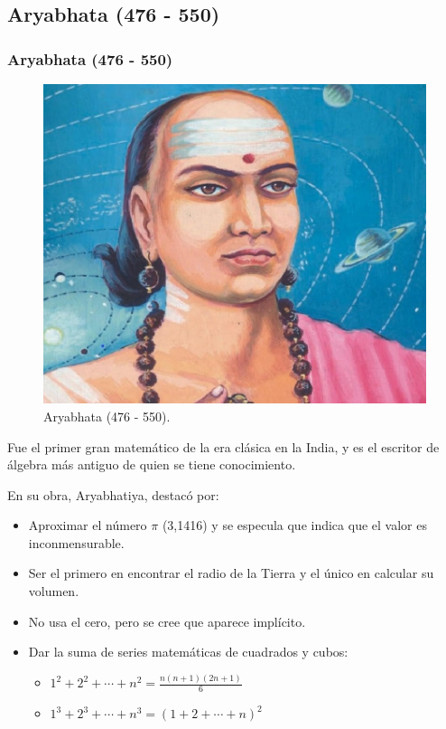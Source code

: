 \documentclass[compress, aspectratio=169]{beamer} %
\begin{document}
	\subsection{Aryabhata (476 - 550)}
		\begin{frame}
			\frametitle{Aryabhata (476 - 550)}
			\begin{figure}
				\centering
				\includegraphics[width = .4\linewidth]{aryabhata.jpg}
				\caption{Aryabhata (476 - 550).}
			\end{figure}
		\end{frame}
		
		\begin{frame}
			Fue el primer gran matemático de la era clásica en la India, y es el escritor de álgebra más antiguo
			de quien se tiene conocimiento.
			
			En su obra, Aryabhatiya, destacó por:
			\begin{itemize}
				\item Aproximar el número $\pi$ (3,1416) y se especula que indica que el valor es inconmensurable.
				\item Ser el primero en encontrar el radio de la Tierra y el único en calcular su volumen.
				\item No usa el cero, pero se cree que aparece implícito.					
				\item Dar la suma de series matemáticas de cuadrados y cubos:
				\begin{itemize}
					\item $\displaystyle 1^2 + 2^2 + \cdots + n^2 = \frac{n(n + 1)(2n + 1)}{6}$
					\item $\displaystyle 1^{3} + 2^{3} + \cdots + n^{3} = (1+2+\cdots +n)^{2}$ 
				\end{itemize}
			\end{itemize}			
		\end{frame}
			
\end{document}
